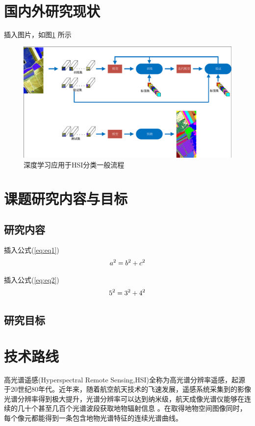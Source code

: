 \documentclass[hyperref,UTF8]{ctexart}
\begin{document}
\newpage
\section{国内外研究现状}
插入图片，如图\ref{fig:figure1} 所示 \\
\begin{figure}[H]
	\centering
	\includegraphics[scale=0.8]{CNN.pdf} %
	\caption{深度学习应用于HSI分类一般流程}
	\label{fig:figure1}
\end{figure}


\section{课题研究内容与目标}
\subsection{研究内容}
插入公式(\ref{eq:eq1}) \\

\begin{equation}
	\centering
	a^2 = b^2 + c^2
	\label{eq:eq1}
\end{equation}


插入公式(\ref{eq:eq2}) \\
\begin{equation}
	\centering
	5^2 = 3^2 + 4^2
	\label{eq:eq2}
\end{equation}
	
\subsection{研究目标}

\section{技术路线}
高光谱遥感(Hyperspectral Remote Sensing,HSI)全称为高光谱分辨率遥感，起源于20世纪80年代。近年来，随着航空航天技术的飞速发展，遥感系统采集到的影像光谱分辨率得到极大提升，光谱分辨率可以达到纳米级，航天成像光谱仪能够在连续的几十个甚至几百个光谱波段获取地物辐射信息 \cite{张兵2017}。在取得地物空间图像同时，每个像元都能得到一条包含地物光谱特征的连续光谱曲线。
\end{document}
